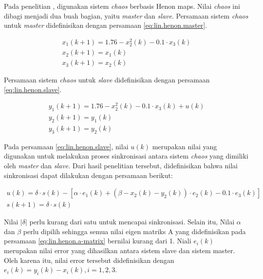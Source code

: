Pada penelitian \textcite{lin2021}, digunakan sistem \emph{chaos} berbasis Henon maps. Nilai \emph{chaos} ini dibagi menjadi dua buah bagian, yaitu \emph{master} dan \emph{slave}. Persamaan sistem \emph{chaos} untuk \emph{master} didefinisikan dengan persamaan \ref{eq:lin.henon.master}.

\begin{equation}
  \label{eq:lin.henon.master}
  \begin{array}{l}   
    x_1(k+1) = 1.76 - x_2^2(k) - 0.1 \cdot x_3(k)\\
    x_2(k+1) = x_1(k)\\
    x_3(k+1) = x_2(k)
  \end{array}
\end{equation}

Persamaan sistem \emph{chaos} untuk \emph{slave} didefinisikan dengan persamaan \ref{eq:lin.henon.slave}.

\begin{equation}
  \label{eq:lin.henon.slave}
  \begin{array}{l}   
    y_1(k+1) = 1.76 - x_2^2(k) - 0.1 \cdot x_3(k) + u(k)\\
    y_2(k+1) = y_1(k)\\
    y_3(k+1) = y_2(k)
  \end{array}
\end{equation}

Pada persamaan \ref{eq:lin.henon.slave}, nilai $u(k)$ merupakan nilai yang digunakan untuk melakukan proses sinkronisasi antara sistem \emph{chaos} yang dimiliki oleh \emph{master} dan \emph{slave}. Dari hasil penelitian tersebut, didefinisikan bahwa nilai sinkronisasi dapat dilakukan dengan persamaan berikut:

\begin{equation}
  \label{eq:lin.henon.sync}
  \begin{array}{l}   
    u(k) = \delta \cdot s(k) - [\alpha \cdot e_1(k) + (\beta - x_2(k) - y_2(k)) \cdot e_2(k) - 0.1 \cdot e_3(k)]\\
    s(k+1) = \delta \cdot s(k)
  \end{array}
\end{equation}

Nilai $|\delta|$ perlu kurang dari satu untuk mencapai sinkronisasi. Selain itu, Nilai $\alpha$ dan $\beta$ perlu dipilih sehingga semua nilai eigen matriks A yang didefinisikan pada persamaan \ref{eq:lin.henon.a-matrix} bernilai kurang dari 1. Niali $e_i(k)$ merupakan nilai error yang dihasilkan antara sistem slave dan sistem master. Oleh karena itu, nilai error tersebut didefinisikan dengan $e_i(k) = y_i(k) - x_i(k), i = 1,2,3$.

